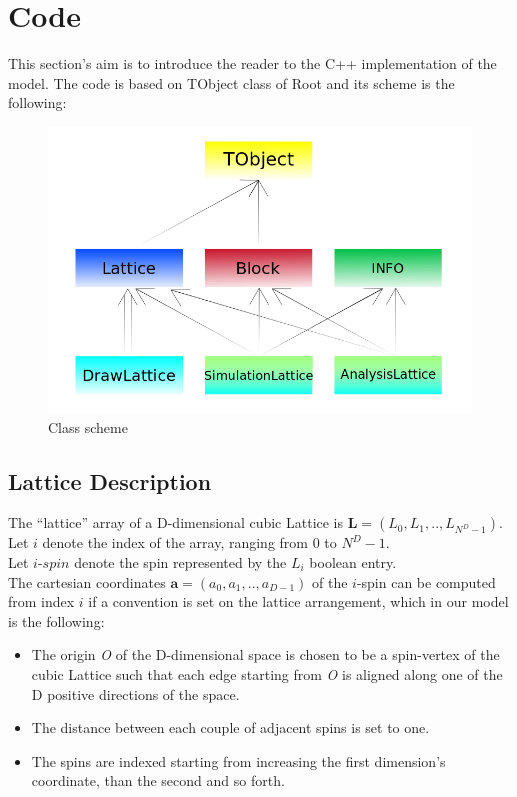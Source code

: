 \documentclass[11pt,a4paper]{article}
\begin{document}
 



\newpage 
\section{Code}
This section's aim is to introduce the reader to the C++ implementation of the model. The code is based on TObject class of Root and its scheme is the following:

\begin{figure}[h!]
\centering
\includegraphics[scale=0.45]{img/Schema_classi.png}   
\caption{Class scheme}
\end{figure}




\subsection{Lattice Description}

The “lattice” array of a D-dimensional cubic Lattice is $\mathbf{L} = (L_0,L_1,..,L_{N^D-1})$.
Let $i$ denote the index of the array, ranging from $0$ to $N^D-1$.\\
Let $i$-$spin$ denote the spin represented by the $L_i$ boolean entry. \\
The cartesian coordinates $\mathbf{a} = (a_0,a_1,..,a_{D-1})$ of the $i$-spin can be computed from index $i$ if a convention is set on the lattice arrangement, which in our model is the following: 
\begin{itemize}
	\item The origin \textit{O} of the D-dimensional space is chosen to be a spin-vertex of the cubic Lattice such that each edge starting from \textit{O} is aligned along one of the D positive directions of the space. 
	\item The distance between each couple of adjacent spins is set to one. 
	\item The spins are indexed starting from increasing the first dimension’s coordinate, than the second and so forth.
\end{itemize}
\end{document}
